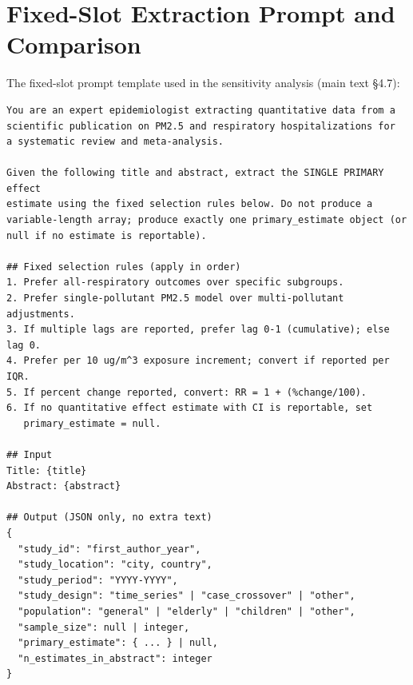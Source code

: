 \documentclass[11pt]{article}
\begin{document}
\section{Fixed-Slot Extraction Prompt and Comparison}
\label{sec:fixedslot_supp}

The fixed-slot prompt template used in the sensitivity analysis (main text \S4.7):

\begin{lstlisting}[language={},caption={Fixed-slot extraction prompt (\texttt{configs/prompts/extraction\_fixed\_slot.txt})}]
You are an expert epidemiologist extracting quantitative data from a
scientific publication on PM2.5 and respiratory hospitalizations for
a systematic review and meta-analysis.

Given the following title and abstract, extract the SINGLE PRIMARY effect
estimate using the fixed selection rules below. Do not produce a
variable-length array; produce exactly one primary_estimate object (or
null if no estimate is reportable).

## Fixed selection rules (apply in order)
1. Prefer all-respiratory outcomes over specific subgroups.
2. Prefer single-pollutant PM2.5 model over multi-pollutant adjustments.
3. If multiple lags are reported, prefer lag 0-1 (cumulative); else lag 0.
4. Prefer per 10 ug/m^3 exposure increment; convert if reported per IQR.
5. If percent change reported, convert: RR = 1 + (%change/100).
6. If no quantitative effect estimate with CI is reportable, set
   primary_estimate = null.

## Input
Title: {title}
Abstract: {abstract}

## Output (JSON only, no extra text)
{
  "study_id": "first_author_year",
  "study_location": "city, country",
  "study_period": "YYYY-YYYY",
  "study_design": "time_series" | "case_crossover" | "other",
  "population": "general" | "elderly" | "children" | "other",
  "sample_size": null | integer,
  "primary_estimate": { ... } | null,
  "n_estimates_in_abstract": integer
}
\end{lstlisting}
\end{document}
